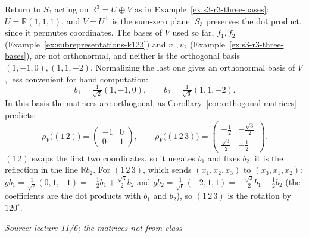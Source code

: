 \documentclass[11pt]{report}
\newcommand{\srcline}[1]{\par\hfill{\footnotesize\textit{Source: #1}}}
\begin{document}
\begin{exbox}\label{ex:s3-orthonormal-basis}
Return to $S_3$ acting on $\mathbb{R}^3 = U \oplus V$ as in Example~\ref{ex:s3-r3-three-bases}: $U = \mathbb{R}(1,1,1)$, and $V = U^\perp$ is the sum-zero plane. $S_3$ preserves the dot product, since it permutes coordinates. The bases of $V$ used so far, $f_1, f_2$ (Example~\ref{ex:subrepresentations-k123}) and $v_1, v_2$ (Example~\ref{ex:s3-r3-three-bases}), are not orthonormal, and neither is the orthogonal basis $(1,-1,0), (1,1,-2)$. Normalizing the last one gives an orthonormal basis of $V$, less convenient for hand computation:
\[ b_1 = \tfrac{1}{\sqrt{2}}(1, -1, 0), \qquad b_2 = \tfrac{1}{\sqrt{6}}(1, 1, -2). \]
In this basis the matrices are orthogonal, as Corollary~\ref{cor:orthogonal-matrices} predicts:
\[ \rho_V\big((1\,2)\big) = \begin{pmatrix} -1 & 0 \\ 0 & 1 \end{pmatrix}, \qquad \rho_V\big((1\,2\,3)\big) = \begin{pmatrix} -\tfrac12 & -\tfrac{\sqrt3}{2} \\ \tfrac{\sqrt3}{2} & -\tfrac12 \end{pmatrix}. \]
$(1\,2)$ swaps the first two coordinates, so it negates $b_1$ and fixes $b_2$: it is the reflection in the line $\mathbb{R}b_2$. For $(1\,2\,3)$, which sends $(x_1, x_2, x_3)$ to $(x_3, x_1, x_2)$: $gb_1 = \tfrac{1}{\sqrt2}(0, 1, -1) = -\tfrac12 b_1 + \tfrac{\sqrt3}{2} b_2$ and $gb_2 = \tfrac{1}{\sqrt6}(-2, 1, 1) = -\tfrac{\sqrt3}{2} b_1 - \tfrac12 b_2$ (the coefficients are the dot products with $b_1$ and $b_2$), so $(1\,2\,3)$ is the rotation by $120^\circ$.
\srcline{lecture 11/6; the matrices not from class}
\end{exbox}
\end{document}
